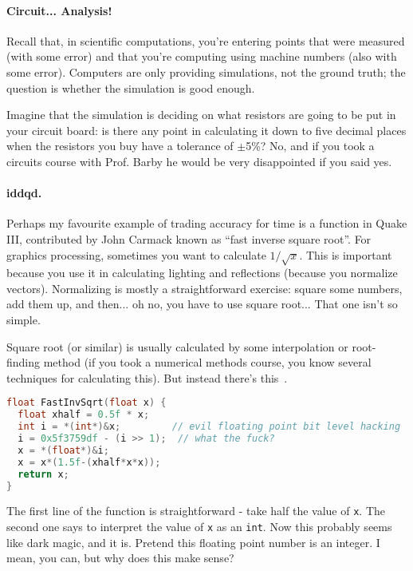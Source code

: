 \paragraph{Circuit... Analysis!} Recall that, in scientific computations, you're entering points that were measured (with some error) and that you're computing using machine numbers (also with some error). Computers are only providing simulations, not the ground truth; the question is whether the simulation is good enough.

Imagine that the simulation is deciding on what resistors are going to be put in your circuit board: is there any point in calculating it down to five decimal places when the resistors you buy have a tolerance of $\pm$5\%? No, and if you took a circuits course with Prof. Barby he would be very disappointed if you said yes.


\paragraph{iddqd.} Perhaps my favourite example of trading accuracy for time is a function in Quake III, contributed by John Carmack known as ``fast inverse square root''. For graphics processing, sometimes you want to calculate $1/\sqrt{x}$. This is important because you use it in calculating lighting and reflections (because you normalize vectors). Normalizing is mostly a straightforward exercise: square some numbers, add them up, and then... oh no, you have to use square root... That one isn't so simple.

Square root (or similar) is usually calculated by some interpolation or root-finding method (if you took a numerical methods course, you know several techniques for calculating this). But instead there's this~\cite{fisqrt}. 

\begin{lstlisting}[language=C]
float FastInvSqrt(float x) {
  float xhalf = 0.5f * x;
  int i = *(int*)&x;         // evil floating point bit level hacking
  i = 0x5f3759df - (i >> 1);  // what the fuck?
  x = *(float*)&i;
  x = x*(1.5f-(xhalf*x*x));
  return x;
}
\end{lstlisting}

The first line of the function is straightforward - take half the value of \texttt{x}. The second one says to interpret the value of \texttt{x} as an \texttt{int}. Now this probably seems like dark magic, and it is. Pretend this floating point number is an integer. I mean, you can, but why does this make sense? 

